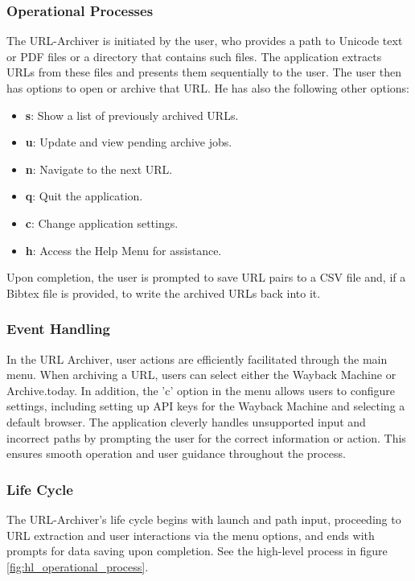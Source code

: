 \subsubsection{Operational Processes}
The URL-Archiver is initiated by the user, who provides a path to Unicode text or PDF files or a directory that contains such files. The application extracts URLs from these files and presents them sequentially to the user. The user then has options to open or archive that URL. He has also the following other options: 
\begin{itemize}
	\item \textbf{s}: Show a list of previously archived URLs.
	\item \textbf{u}: Update and view pending archive jobs.
	\item \textbf{n}: Navigate to the next URL.
	\item \textbf{q}: Quit the application.
	\item \textbf{c}: Change application settings.
	\item \textbf{h}: Access the Help Menu for assistance.
\end{itemize}

Upon completion, the user is prompted to save URL pairs to a CSV file and, if a Bibtex file is provided, to write the archived URLs back into it. 


\subsubsection{Event Handling}
In the URL Archiver, user actions are efficiently facilitated through the main menu. When archiving a URL, users can select either the Wayback Machine or Archive.today. In addition, the 'c' option in the menu allows users to configure settings, including setting up API keys for the Wayback Machine and selecting a default browser. The application cleverly handles unsupported input and incorrect paths by prompting the user for the correct information or action. This ensures smooth operation and user guidance throughout the process.

\subsubsection{Life Cycle}
The URL-Archiver’s life cycle begins with launch and path input, proceeding to URL extraction and user interactions via the menu options, and ends with prompts for data saving upon completion. See the high-level process in figure \ref{fig:hl_operational_process}.

